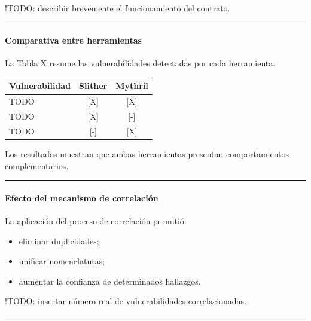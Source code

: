 !TODO: describir brevemente el funcionamiento del contrato.

\begin{center}\rule{0.5\linewidth}{0.5pt}\end{center}

\paragraph{Comparativa entre
herramientas}\label{comparativa-entre-herramientas}

La Tabla X resume las vulnerabilidades detectadas por cada herramienta.

{\def\LTcaptype{none} %
\begin{longtable}[]{@{}lcc@{}}
\toprule\noalign{}
Vulnerabilidad & Slither & Mythril \\
\midrule\noalign{}
\endhead
\bottomrule\noalign{}
\endlastfoot
TODO & {[}X{]} & {[}X{]} \\
TODO & {[}X{]} & {[}-{]} \\
TODO & {[}-{]} & {[}X{]} \\
\end{longtable}
}

Los resultados muestran que ambas herramientas presentan comportamientos
complementarios.

\begin{center}\rule{0.5\linewidth}{0.5pt}\end{center}

\paragraph{Efecto del mecanismo de
correlación}\label{efecto-del-mecanismo-de-correlaciuxf3n}

La aplicación del proceso de correlación permitió:

\begin{itemize}
\tightlist
\item
  eliminar duplicidades;
\item
  unificar nomenclaturas;
\item
  aumentar la confianza de determinados hallazgos.
\end{itemize}

!TODO: insertar número real de vulnerabilidades correlacionadas.

\begin{center}\rule{0.5\linewidth}{0.5pt}\end{center}

